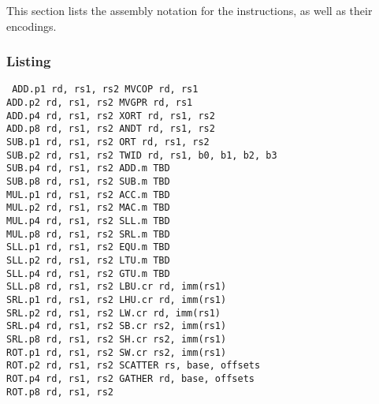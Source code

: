This section lists the assembly notation for the instructions, as well as
their encodings.

\subsubsection{Listing}

{\tt
ADD.p1  rd, rs1, rs2 \quad\quad\quad MVCOP   rd, rs1                 \\
ADD.p2  rd, rs1, rs2 \quad\quad\quad MVGPR   rd, rs1                 \\
ADD.p4  rd, rs1, rs2 \quad\quad\quad XORT    rd, rs1, rs2            \\
ADD.p8  rd, rs1, rs2 \quad\quad\quad ANDT    rd, rs1, rs2            \\
SUB.p1  rd, rs1, rs2 \quad\quad\quad ORT     rd, rs1, rs2            \\
SUB.p2  rd, rs1, rs2 \quad\quad\quad TWID    rd, rs1, b0, b1, b2, b3 \\
SUB.p4  rd, rs1, rs2 \quad\quad\quad ADD.m   TBD                     \\
SUB.p8  rd, rs1, rs2 \quad\quad\quad SUB.m   TBD                     \\
MUL.p1  rd, rs1, rs2 \quad\quad\quad ACC.m   TBD                     \\
MUL.p2  rd, rs1, rs2 \quad\quad\quad MAC.m   TBD                     \\
MUL.p4  rd, rs1, rs2 \quad\quad\quad SLL.m   TBD                     \\
MUL.p8  rd, rs1, rs2 \quad\quad\quad SRL.m   TBD                     \\
SLL.p1  rd, rs1, rs2 \quad\quad\quad EQU.m   TBD                     \\
SLL.p2  rd, rs1, rs2 \quad\quad\quad LTU.m   TBD                     \\
SLL.p4  rd, rs1, rs2 \quad\quad\quad GTU.m   TBD                     \\
SLL.p8  rd, rs1, rs2 \quad\quad\quad LBU.cr  rd, imm(rs1)            \\
SRL.p1  rd, rs1, rs2 \quad\quad\quad LHU.cr  rd, imm(rs1)            \\
SRL.p2  rd, rs1, rs2 \quad\quad\quad LW.cr   rd, imm(rs1)            \\
SRL.p4  rd, rs1, rs2 \quad\quad\quad SB.cr   rs2, imm(rs1)           \\
SRL.p8  rd, rs1, rs2 \quad\quad\quad SH.cr   rs2, imm(rs1)           \\
ROT.p1  rd, rs1, rs2 \quad\quad\quad SW.cr   rs2, imm(rs1)           \\
ROT.p2  rd, rs1, rs2 \quad\quad\quad SCATTER rs, base, offsets       \\
ROT.p4  rd, rs1, rs2 \quad\quad\quad GATHER  rd, base, offsets       \\
ROT.p8  rd, rs1, rs2 \quad\quad\quad 
}


